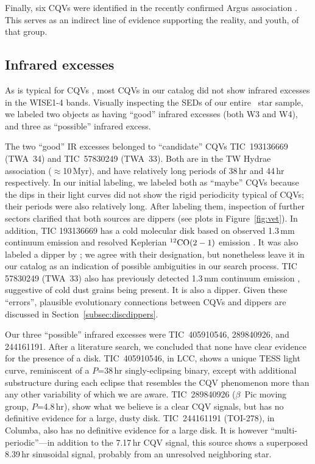 \documentclass[11pt,twocolumn,tighten]{aastex63}
\begin{document}
Finally, six CQVs were identified in the recently confirmed Argus
association \citep{2019ApJ...870...27Z}.  This serves as an indirect
line of evidence supporting the reality, and youth, of that group.


\subsection{Infrared excesses}
\label{subsec:irexcess}

As is typical for CQVs \citep{2017AJ....153..152S}, most CQVs in our
catalog did not show infrared excesses in the WISE1-4 bands.
Visually inspecting the SEDs of our entire \ncpvsfound\ star sample,
we labeled two objects as having ``good'' infrared excesses (both W3
and W4), and three as ``possible'' infrared excess.

The two ``good'' IR excesses belonged to ``candidate'' CQVs
TIC~193136669 (TWA~34) and TIC~57830249 (TWA~33).  Both are in the TW
Hydrae association ($\approx$10\,Myr), and have relatively long
periods of 38\,hr and 44\,hr respectively.  In our initial labeling,
we labeled both as ``maybe'' CQVs because the dips in their light
curves did not show the rigid periodicity typical of CQVs;  their
periods were also relatively long.  After labeling them, inspection
of further sectors clarified that both sources are dippers (see plots
in Figure~\ref{fig:vet}).  In addition, TIC 193136669 has a cold
molecular disk based on observed 1.3\,mm continuum emission and
resolved Keplerian $^{12}{\rm CO}(2-1)$ emission
\citep{2015A&A...582L...5R}.  It was also labeled a dipper by
\citet{2022ApJS..263...14C}; we agree with their designation, but
nonetheless leave it in our catalog as an indication of possible
ambiguities in our search process.  TIC 57830249 (TWA~33) also has
previously detected 1.3\,mm continuum emission
\citep{2015A&A...582L...5R}, suggestive of cold dust grains being
present.  It is also a dipper.
Given these ``errors'', plausible evolutionary connections between CQVs and
dippers are discussed in Section~\ref{subsec:discdippers}.

Our three ``possible'' infrared excesses were TIC~405910546,
289840926, and 244161191.  After a literature search, we concluded
that none have clear evidence for the presence of a disk.
TIC~405910546, in LCC, shows a unique TESS light curve, reminiscent of
a $P$=38\,hr singly-eclipsing binary, except with additional
substructure during each eclipse that resembles the CQV phenomenon
more than any other variability of which we are aware.  TIC~289840926
($\beta$~Pic moving group, $P$=4.8\,hr), show what we believe is a
clear CQV signals, but has no definitive evidence for a large, dusty
disk.  TIC~244161191 (TOI-278), in Columba, also has no
definitive evidence for a large disk.  It is however
``multi-periodic''---in addition to the 7.17\,hr CQV signal, this
source shows a superposed 8.39\,hr sinusoidal signal, probably from an
unresolved neighboring star.
\end{document}
